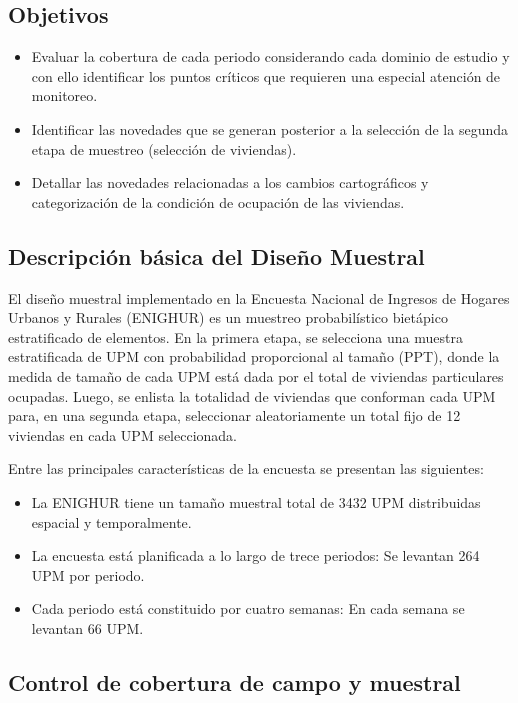 \documentclass[
]{article}
\providecommand{\tightlist}{%
  \setlength{\itemsep}{0pt}\setlength{\parskip}{0pt}}
\begin{document}
\textcolor{trueblue}{\section{Objetivos}}

\begin{itemize}
\item
  Evaluar la cobertura de cada periodo considerando cada dominio de
  estudio y con ello identificar los puntos críticos que requieren una
  especial atención de monitoreo.
\item
  Identificar las novedades que se generan posterior a la selección de
  la segunda etapa de muestreo (selección de viviendas).
\item
  Detallar las novedades relacionadas a los cambios cartográficos y
  categorización de la condición de ocupación de las viviendas.
\end{itemize}

\textcolor{trueblue}{\section{Descripción básica del Diseño Muestral}}

El diseño muestral implementado en la Encuesta Nacional de Ingresos de
Hogares Urbanos y Rurales (ENIGHUR) es un muestreo probabilístico
bietápico estratificado de elementos. En la primera etapa, se selecciona
una muestra estratificada de UPM con probabilidad proporcional al tamaño
(PPT), donde la medida de tamaño de cada UPM está dada por el total de
viviendas particulares ocupadas. Luego, se enlista la totalidad de
viviendas que conforman cada UPM para, en una segunda etapa, seleccionar
aleatoriamente un total fijo de 12 viviendas en cada UPM seleccionada.

Entre las principales características de la encuesta se presentan las
siguientes:

\begin{itemize}
\tightlist
\item
  La ENIGHUR tiene un tamaño muestral total de 3432 UPM distribuidas
  espacial y temporalmente.
\item
  La encuesta está planificada a lo largo de trece periodos: Se levantan
  264 UPM por periodo.
\item
  Cada periodo está constituido por cuatro semanas: En cada semana se
  levantan 66 UPM.
\end{itemize}

\textcolor{trueblue}{\section{Control de cobertura de campo y muestral}}
\end{document}
